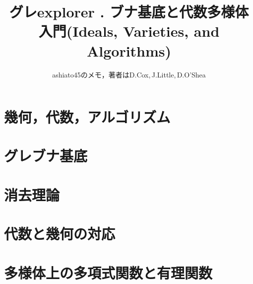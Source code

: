 \documentclass[9pt]{ltjsarticle}
\title{グレexplorer .
ブナ基底と代数多様体入門(Ideals, Varieties, and Algorithms)}
\author{ashiato45のメモ，著者はD.Cox,\,J.Little,\,D.O'Shea}
\begin{document}
\maketitle


\section{幾何，代数，アルゴリズム}
%


\section{グレブナ基底}
% 


\section{消去理論}
%

\section{代数と幾何の対応}


\section{多様体上の多項式関数と有理関数}

\end{document}

